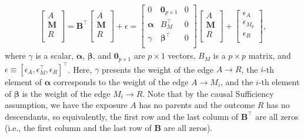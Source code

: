 \begin{eqnarray}\label{lsem}
\begin{bmatrix}

   			A\\
   			\boldsymbol{M}\\
			R\\
		\end{bmatrix}
		=\boldsymbol{B}^\top \begin{bmatrix}
   			A\\
   			\boldsymbol{M}\\
			R\\
		\end{bmatrix}+\epsilon
		=\begin{bmatrix}
   			0& \textbf{0}_{p\times1} &0\\
			\boldsymbol{\alpha}&B_M^\top&0\\
   			\gamma&\boldsymbol{\beta}^\top&0\\
		\end{bmatrix}
		\begin{bmatrix}
   			A\\
   			\boldsymbol{M}\\
			R\\
		\end{bmatrix}
		+\begin{bmatrix}
   			\epsilon_A\\
   			\epsilon_{M_p}\\
			\epsilon_R\\
		\end{bmatrix},
\end{eqnarray}
where $\gamma$ is a scalar, $\boldsymbol{\alpha}$, $\boldsymbol{\beta} $, and $\textbf{0}_{p\times1}$ are $p\times 1$ vectors, $B_M$ is a $p\times p$ matrix, and $\epsilon\equiv [\epsilon_A,\epsilon_{M}^\top, \epsilon_R]^\top $. Here, $\gamma$ presents the weight of the edge $A\rightarrow R$, the $i$-th element of $\boldsymbol{\alpha}$ corresponds to the weight of the edge $A\rightarrow M_i$, and the  $i$-th element of $\boldsymbol{\beta} $ is the weight of the edge $M_i \rightarrow R$. Note that by the causal Sufficiency assumption, we have the exposure $A$ has no parents and the outcome $R$ has no descendants, so equivalently, the first row and the last column of $\boldsymbol{B}^\top$ are all zeros (i.e., the first column and the last row of $\boldsymbol{B}$ are all zeros). 
